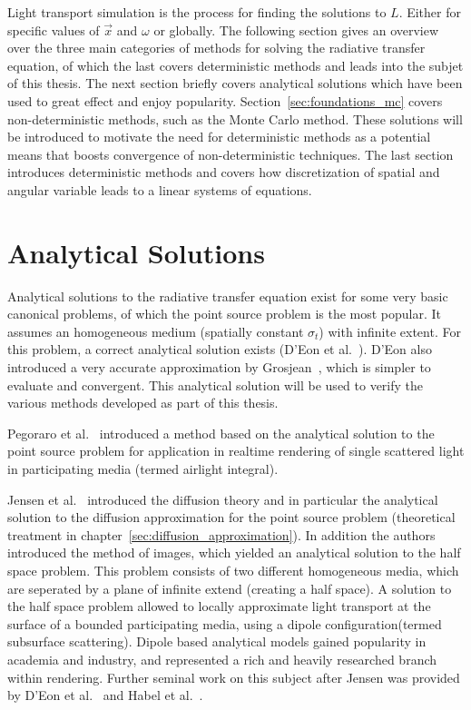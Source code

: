 Light transport simulation is the process for finding the solutions to $L$. Either for specific values of $\vec{x}$ and $\omega$ or globally. The following section gives an overview over the three main categories of methods for solving the radiative transfer equation, of which the last covers deterministic methods and leads into the subjet of this thesis. The next section briefly covers analytical solutions which have been used to great effect and enjoy popularity. Section~\ref{sec:foundations_mc} covers non-deterministic methods, such as the Monte Carlo method. These solutions will be introduced to motivate the need for deterministic methods as a potential means that boosts convergence of non-deterministic techniques. The last section introduces deterministic methods and covers how discretization of spatial and angular variable leads to a linear systems of equations.

\section{Analytical Solutions}
\label{sec:foundations_analytical}

Analytical solutions to the radiative transfer equation exist for some very basic canonical problems, of which the point source problem is the most popular. It assumes an homogeneous medium (spatially constant $\sigma_t$) with infinite extent. For this problem, a correct analytical solution exists (D'Eon et al.~\cite{dEon11}). D'Eon also introduced a very accurate approximation by Grosjean~\cite{Grosjean56}, which is simpler to evaluate and convergent. This analytical solution will be used to verify the various methods developed as part of this thesis.

Pegoraro et al.~\cite{Pegoraro11} introduced a method based on the analytical solution to the point source problem for application in realtime rendering of single scattered light in participating media (termed airlight integral).

Jensen et al.~\cite{Jensen01} introduced the diffusion theory and in particular the analytical solution to the diffusion approximation for the point source problem (theoretical treatment in chapter~\ref{sec:diffusion_approximation}). In addition the authors introduced the method of images, which yielded an analytical solution to the half space problem. This problem consists of two different homogeneous media, which are seperated by a plane of infinite extend (creating a half space). A solution to the half space problem allowed to locally approximate light transport at the surface of a bounded participating media, using a dipole configuration(termed subsurface scattering). Dipole based analytical models gained popularity in academia and industry, and represented a rich and heavily researched branch within rendering. Further seminal work on this subject after Jensen was provided by D'Eon et al.~\cite{dEon11} and Habel et al.~\cite{Habel13}.

